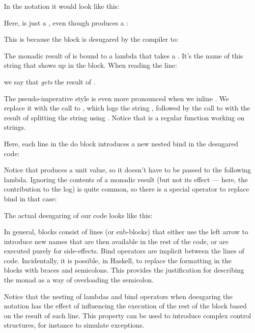 In the  notation it would look like this:

Here,  is just a , even though
 produces a :

This is because the  block is desugared by the compiler to:

The monadic result of  is bound to a lambda that takes a
. It's the name of this string that shows up in the
 block. When reading the line:

we say that  \emph{gets} the result of .

The pseudo-imperative style is even more pronounced when we inline
. We replace it with the call to , which
logs the string , followed by the call to
 with the result of splitting the string 
using . Notice that  is a regular function
working on strings.

Here, each line in the do block introduces a new nested bind in the
desugared code:

Notice that  produces a unit value, so it doesn't have to
be passed to the following lambda. Ignoring the contents of a monadic
result (but not its effect --- here, the contribution to the log) is
quite common, so there is a special operator to replace bind in that
case:

The actual desugaring of our code looks like this:

In general,  blocks consist of lines (or sub-blocks) that
either use the left arrow to introduce new names that are then available
in the rest of the code, or are executed purely for side-effects. Bind
operators are implicit between the lines of code. Incidentally, it is
possible, in Haskell, to replace the formatting in the 
blocks with braces and semicolons. This provides the justification for
describing the monad as a way of overloading the semicolon.

Notice that the nesting of lambdas and bind operators when desugaring
the  notation has the effect of influencing the execution of
the rest of the  block based on the result of each line. This
property can be used to introduce complex control structures, for
instance to simulate exceptions.

